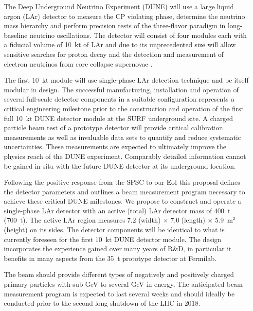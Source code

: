 \vspace{0.5cm}
The Deep Underground Neutrino Experiment (DUNE) will use a large liquid argon (LAr) detector to measure the CP violating phase, determine the neutrino mass hierarchy and perform precision tests of the three-flavor paradigm in long-baseline neutrino oscillations. The detector will consist of four modules 
each with a fiducial volume of 10~kt of LAr and due to its unprecedented size will allow sensitive searches for proton decay and the detection and measurement of electron neutrinos from core collapse supernovae \cite{dunecdr}.

The first 10~kt module will use single-phase LAr detection technique and be itself modular in design. The successful manufacturing, installation and operation of several full-scale detector components in a suitable configuration represents a critical engineering milestone prior to the construction and operation of the first full 10~kt DUNE detector module at the SURF underground site. 
A charged particle beam test of a prototype detector will provide critical
calibration measurements as well as invaluable data sets to quantify and
reduce systematic uncertainties.
These measurements are expected to ultimately improve the physics reach of the DUNE experiment. Comparably detailed information cannot be gained in-situ with the future DUNE detector at its underground location.

Following the positive response from the SPSC to our EoI \cite{eoi} 
this proposal defines the detector parameters and outlines a beam measurement program
necessary to achieve these critical DUNE milestones.
%
We propose to construct and operate a single-phase LAr detector with an active (total) LAr detector mass of 400~t (700~t). 
The active LAr region measures 7.2 (width) $\times$ 7.0 (length) $\times$ 5.9~m$^3$ (height) on its sides.
The detector components will be identical to what is currently foreseen for the first 10~kt DUNE detector module. The design incorporates the
experience gained over many years of R\&D, in particular it benefits in many aspects from the 35~t prototype detector at Fermilab.

The beam should provide different types of negatively and positively charged primary particles with 
sub-GeV to several GeV in energy.
The anticipated beam measurement program
is expected to last several weeks and should ideally be conducted prior to the second 
long shutdown of the LHC in 2018. 


